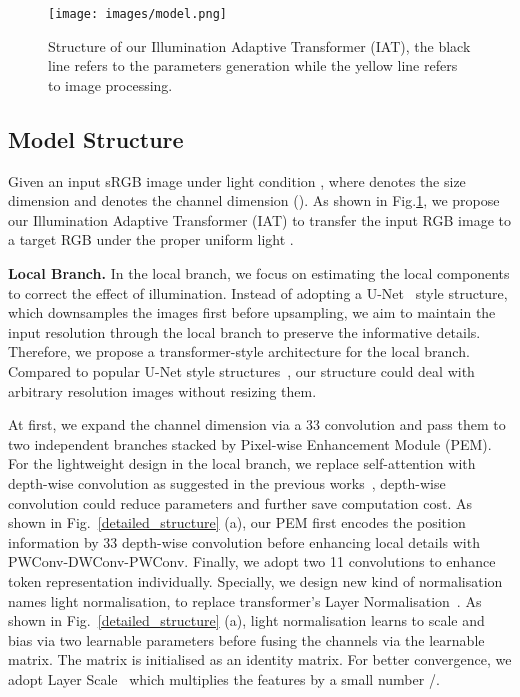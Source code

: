 \documentclass{bmvc2k}
\begin{document}
\begin{figure}[t]
    \centering
    \texttt{[image: images/model.png]}
    
    \caption{Structure of our Illumination Adaptive Transformer (IAT), the black line refers to the parameters generation while the yellow line refers to image processing.}
    \label{fig_model_structure}
    
\end{figure}

\subsection{Model Structure}
\label{sec:model}
Given an input sRGB image  under light condition , where  denotes the size dimension and  denotes the channel dimension (). As shown in Fig.\ref{fig_model_structure}, we propose our Illumination Adaptive Transformer (IAT) to transfer the input RGB image    to a target RGB  under the proper uniform light . 



\textbf{Local Branch.}
In the local branch, we focus on estimating the local components  to correct the effect of illumination. Instead of adopting a U-Net~\cite{unet} style structure, which downsamples the images first before upsampling, we aim to maintain the input resolution through the local branch to preserve the informative details.  Therefore, we propose a transformer-style architecture for the local branch. Compared to popular U-Net style structures~\cite{Lv2018MBLLEN,Exposure_2021_CVPR}, our structure could deal with arbitrary resolution images without resizing them.

At first, we expand the channel dimension via a 33 convolution and pass them to two independent branches stacked by Pixel-wise Enhancement Module (PEM). For the lightweight design in the local branch, we replace self-attention with depth-wise convolution as suggested in the previous works~\cite{han2021connection,uniformer1}, depth-wise convolution could reduce parameters and further save computation cost.
As shown in Fig.~\ref{detailed_structure} (a), our PEM first encodes the position information by 33 depth-wise convolution before enhancing local details with  PWConv-DWConv-PWConv. Finally, we adopt two 11 convolutions to enhance token representation individually.
Specially, we design new kind of normalisation names light normalisation, to replace transformer's Layer Normalisation~\cite{ln}. As shown in Fig.~\ref{detailed_structure} (a), light normalisation learns to scale  and bias  via two learnable parameters before fusing the channels via the learnable matrix. The matrix is initialised as an identity matrix.
For better convergence, we adopt Layer Scale~\cite{cait} which multiplies the features by a small number /.
\end{document}
